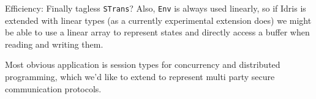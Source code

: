 
Efficiency: Finally tagless \texttt{STrans}? Also, \texttt{Env} is always used
linearly, so if Idris is extended with linear types (as a currently
experimental extension does) we might be able to use a linear array to
represent states and directly access a buffer when reading and writing them.

Most obvious application is session types for concurrency and distributed
programming, which we'd like to extend to represent multi party secure
communication protocols.


